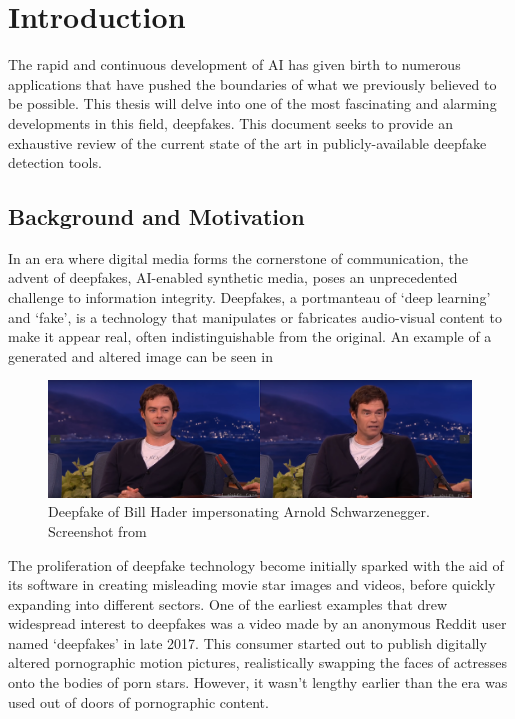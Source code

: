 
\chapter{Introduction}\label{chapter:introduction}
The rapid and continuous development of \ac{AI} has given birth to numerous
applications that have pushed the boundaries of what we previously believed to be possible.
This thesis will delve into one of the most fascinating and alarming developments in this
field, deepfakes. This document seeks to provide an exhaustive review of the current state
of the art in publicly-available deepfake detection tools.



\section{Background and Motivation}\label{chapter:backgroundAndMotivation}
In an era where digital media forms the cornerstone of communication, the advent of deepfakes,
\ac{AI}-enabled synthetic media, poses an unprecedented challenge to information integrity.
Deepfakes, a portmanteau of `deep learning' and `fake', is a technology that manipulates or
fabricates audio-visual content to make it appear real, often indistinguishable from the original.
An example of a generated and altered image can be seen in 

\begin{figure}[hb]
    \centering
    \includegraphics[scale=0.289]{figures/bill-arnold}
    \caption{Deepfake of Bill Hader impersonating Arnold Schwarzenegger. Screenshot from~\cite{bill-hader}}\label{fig:bill-hagel}
\end{figure}

The proliferation of deepfake technology become initially sparked with the aid of 
its software in creating misleading movie star images and videos, before quickly 
expanding into different sectors. One of the earliest examples that drew widespread 
interest to deepfakes was a video made by an anonymous Reddit user named `deepfakes' in late 2017.
This consumer started out to publish digitally altered pornographic motion pictures, 
realistically swapping the faces of actresses onto the bodies of porn stars. 
However, it wasn't lengthy earlier than the era was used out of doors of pornographic content.

